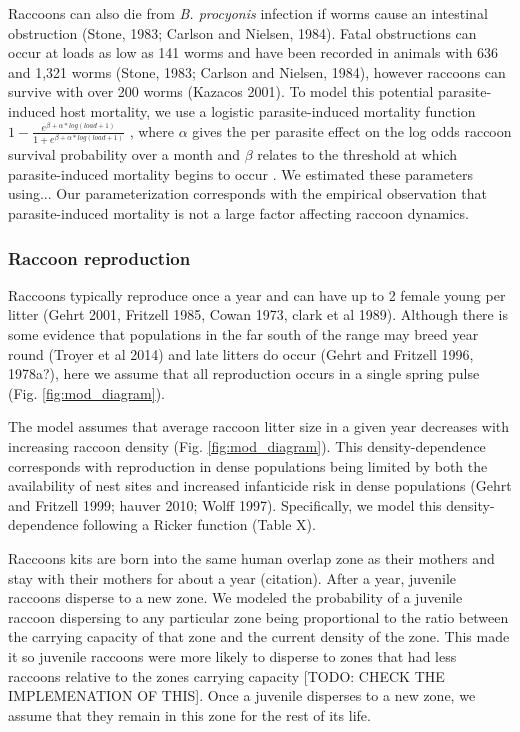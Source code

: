 \documentclass[11pt]{article}
\begin{document}
Raccoons can also die from \emph{B. procyonis} infection if worms cause
an intestinal obstruction (Stone, 1983; Carlson and Nielsen, 1984).
Fatal obstructions can occur at loads as low as 141 worms and have been
recorded in animals with 636 and 1,321 worms (Stone, 1983; Carlson and
Nielsen, 1984), however raccoons can survive with over 200 worms
(Kazacos 2001). To model this potential parasite-induced host mortality,
we use a logistic parasite-induced mortality function
\(1 - \frac{e^{\beta + \alpha*log(load + 1)}}{1 + e^{\beta + \alpha*log(load + 1)}}\)
, where $\alpha$ gives the per parasite effect on the log
odds raccoon survival probability over a month and $\beta$ relates to the threshold at which parasite-induced mortality begins
to occur \citep{Wilber2016}. We estimated these parameters using... Our parameterization corresponds with the empirical observation that parasite-induced mortality is not a large factor affecting raccoon dynamics.

\subsubsection{Raccoon reproduction}

Raccoons typically reproduce once a year and can have up to 2 female
young per litter (Gehrt 2001, Fritzell 1985, Cowan 1973, clark et al
1989). Although there is some evidence that populations in the far south
of the range may breed year round (Troyer et al 2014) and late litters
do occur (Gehrt and Fritzell 1996, 1978a?), here we assume that all
reproduction occurs in a single spring pulse (Fig. \ref{fig:mod_diagram}).

The model assumes that average raccoon litter size in a given year
decreases with increasing raccoon density (Fig. \ref{fig:mod_diagram}). This density-dependence
corresponds with reproduction in dense populations being limited by both
the availability of nest sites and increased infanticide risk in dense
populations (Gehrt and Fritzell 1999; hauver 2010; Wolff 1997).
Specifically, we model this density-dependence following a Ricker
function (Table X).

Raccoons kits are born into the same human overlap zone as their mothers and stay with their mothers for about a year (citation).  After a year, juvenile raccoons disperse to a new zone. We modeled the probability of a juvenile raccoon dispersing to any particular zone being proportional to the ratio between the carrying capacity of that zone and the current density of the zone. This made it so juvenile raccoons were more likely to disperse to zones that had less raccoons relative to the zones carrying capacity [TODO: CHECK THE IMPLEMENATION OF THIS].  Once a juvenile disperses to a new zone, we assume that they remain in this zone for the rest of its life. 
\end{document}
